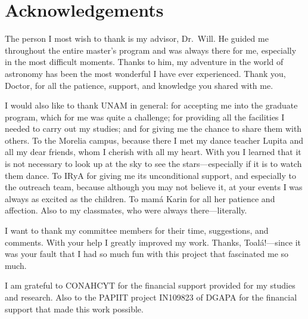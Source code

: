 \documentclass{book}
\begin{document}



\chapter*{Acknowledgements}

The person I most wish to thank is my advisor, Dr.~Will. He guided me
throughout the entire master’s program and was always there for me,
especially in the most difficult moments. Thanks to him, my adventure
in the world of astronomy has been the most wonderful I have ever
experienced. Thank you, Doctor, for all the patience, support, and
knowledge you shared with me.

I would also like to thank UNAM in general: for accepting me into the
graduate program, which for me was quite a challenge; for providing
all the facilities I needed to carry out my studies; and for giving me
the chance to share them with others. To the Morelia campus, because
there I met my dance teacher Lupita and all my dear friends, whom I
cherish with all my heart. With you I learned that it is not necessary
to look up at the sky to see the stars—especially if it is to watch
them dance. To IRyA for giving me its unconditional support, and
especially to the outreach team, because although you may not believe
it, at your events I was always as excited as the children. To mamá
Karin for all her patience and affection. Also to my classmates, who
were always there—literally.

I want to thank my committee members for their time, suggestions, and
comments. With your help I greatly improved my work. Thanks,
Toalá!—since it was your fault that I had so much fun with this
project that fascinated me so much.

I am grateful to CONAHCYT for the financial support provided for my
studies and research. Also to the PAPIIT project IN109823 of DGAPA for
the financial support that made this work possible.
\end{document}

